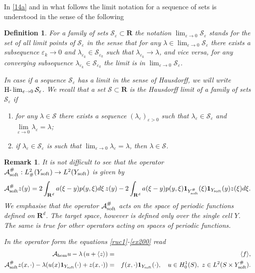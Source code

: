 \documentclass[11pt]{article}
\newcommand\e {\varepsilon}
\newcommand\soft{{\rm soft}}
\def\RR{\R}
\newcommand{\R}{\mathbf{R}}
\def\AA{\mathcal{A}}
\def\SS{\mathcal{S}}
\def\l{\lambda}
\def\hom{{\rm hom}}
\newtheorem{definition}[theorem]{Definition}
\newtheorem{remark}[theorem]{Remark}
\theoremstyle{remark}
\begin{document}
	In \eqref{14a} and in what follows the limit notation for a sequence of sets is understood in the sense of the following
\begin{definition}%
	For a family of sets $\SS_\e \subset \R$ the notation $\lim_{\e \to 0} \SS_\e$ stands for the set of all limit points of $\SS_\e$ in the sense that for any $\l \in \lim_{\e \to 0} \SS_\e$ there exists a subsequence $\e_k \to 0$ and $\l_{\e_k} \in \SS_{\e_k}$ such that $\l_{\e_k} \to \l$, and vice versa, for any converging subsequence $\l_{\e_k} \in \SS_{\e_k}$ the limit is in $\lim_{\e \to 0} \SS_\e$.
	
	 In case if a  sequence $\SS_\e$ has a limit in the sense of Hausdorff, we will write ${\rm H}\mbox{-}\lim_{\e \to 0} \SS_\e$. 	
	We recall that a set $\SS\subset\RR$ is the Hausdorff limit  of a family of sets $\SS_\e$    if
	\begin{enumerate}
		\item 	for any $\lambda \in \mathcal{S}$ there exists a sequence $(\lambda_\e)_{\e>0}$ such that  $\lambda_\e\in \SS_\e$ and $\lim\limits_{\e\to0} \lambda_\e=\lambda$;
		\item if $\lambda_\e \in \SS_\e$ is such that $\lim_{\e\to 0} \lambda_\e=\lambda$, then $\lambda
		\in \SS$.
	\end{enumerate}
\end{definition}
	
	






\begin{remark} \label{remopeq}
	It is not difficult to see that the operator $\AA_\soft^\# : L^2_\#(Y_\soft) \to L^2(Y_\soft)$ is given by
	\begin{equation}\label{14}
		\AA_\soft^\# z(y) = 2 \int_{\mathbf{R}^d}   a(\xi -y)p(y, \xi)d\xi\, z(y) - 2 \int_{\mathbf{R}^d}   a(\xi -y)p(y, \xi) \mathbf{1}_{Y_\soft^{\#}}(\xi) \mathbf{1}_{Y_\soft}(y) z(\xi) d\xi.
	\end{equation}
	We emphasise that the operator $\AA_\soft^\#$ acts on the space of periodic functions defined on $\R^d$. The target space, however is defined only over the single cell $Y$. The same is true for other operators acting on spaces of periodic functions.
	
	In the operator form the equations \eqref{ruc1}-\eqref{ex200} read
	\begin{eqnarray*}%
		\AA_\hom  u-\lambda \left(u+ \langle z \rangle  \right)&=&\langle f \rangle, \\ %
		\AA_\soft^\#  z(x,\cdot)-\lambda (u(x)\mathbf{1}_{Y_\soft }(\cdot)+z(x,\cdot))&=& f(x,\cdot)\mathbf{1}_{Y_\soft }(\cdot), \quad u \in H_0^1(S), \ z \in L^2(S \times Y_\soft^{\#}).
	\end{eqnarray*} 	
\end{remark} 	
\end{document}
